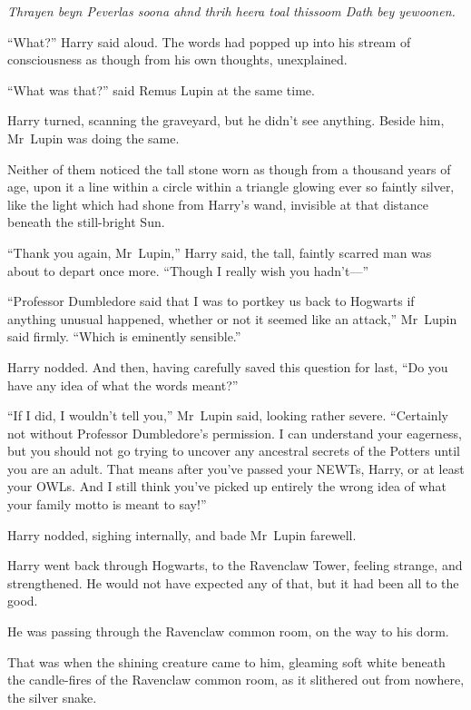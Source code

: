 \emph{Thrayen beyn Peverlas soona ahnd thrih heera toal thissoom Dath bey yewoonen.}

“What?” Harry said aloud. The words had popped up into his stream of consciousness as though from his own thoughts, unexplained.

“What was that?” said Remus Lupin at the same time.

Harry turned, scanning the graveyard, but he didn’t see anything. Beside him, Mr~Lupin was doing the same.

Neither of them noticed the tall stone worn as though from a thousand years of age, upon it a line within a circle within a triangle glowing ever so faintly silver, like the light which had shone from Harry’s wand, invisible at that distance beneath the still-bright Sun.


“Thank you again, Mr~Lupin,” Harry said, the tall, faintly scarred man was about to depart once more. “Though I really wish you hadn’t—”

“Professor Dumbledore said that I was to portkey us back to Hogwarts if anything unusual happened, whether or not it seemed like an attack,” Mr~Lupin said firmly. “Which is eminently sensible.”

Harry nodded. And then, having carefully saved this question for last, “Do you have any idea of what the words meant?”

“If I did, I wouldn’t tell you,” Mr~Lupin said, looking rather severe. “Certainly not without Professor Dumbledore’s permission. I can understand your eagerness, but you should not go trying to uncover any ancestral secrets of the Potters until you are an adult. That means after you’ve passed your NEWTs, Harry, or at least your OWLs. And I still think you’ve picked up entirely the wrong idea of what your family motto is meant to say!”

Harry nodded, sighing internally, and bade Mr~Lupin farewell.

\later

Harry went back through Hogwarts, to the Ravenclaw Tower, feeling strange, and strengthened. He would not have expected any of that, but it had been all to the good.

He was passing through the Ravenclaw common room, on the way to his dorm.

That was when the shining creature came to him, gleaming soft white beneath the candle-fires of the Ravenclaw common room, as it slithered out from nowhere, the silver snake.

